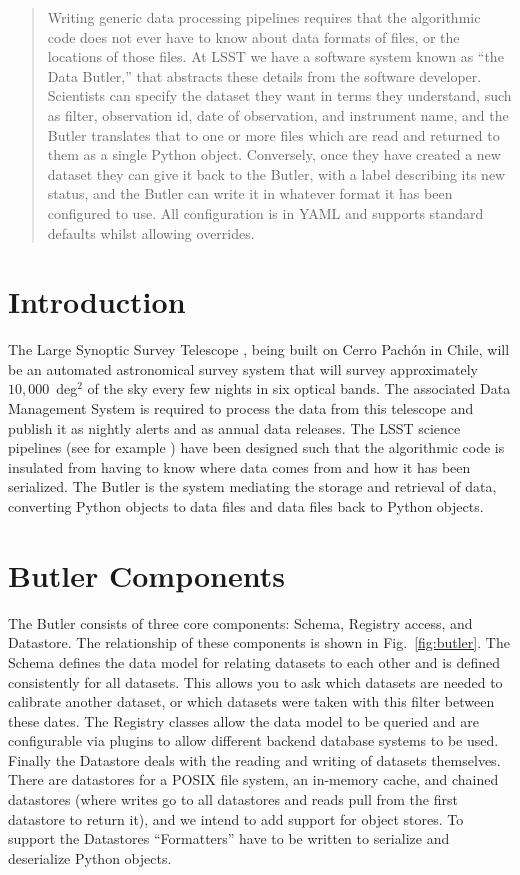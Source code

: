 \documentclass[11pt,twoside]{article}
\begin{document}
\begin{abstract}
  Writing generic data processing pipelines requires that the algorithmic code does not ever have to know about data formats of files, or the locations of those files.
  At LSST we have a software system known as ``the Data Butler,'' that abstracts these details from the software developer.
  Scientists can specify the dataset they want in terms they understand, such as filter, observation id, date of observation, and instrument name, and the Butler translates that to one or more files which are read and returned to them as a single Python object.
  Conversely, once they have created a new dataset they can give it back to the Butler, with a label describing its new status, and the Butler can write it in whatever format it has been configured to use.
  All configuration is in YAML and supports standard defaults whilst allowing overrides.
\end{abstract}

\section{Introduction}

The Large Synoptic Survey Telescope \citep{2008arXiv0805.2366I}, being built on Cerro Pach\'{o}n in Chile, will be an automated astronomical survey system that will survey approximately $10,000$~deg$^2$ of the sky every few nights in six optical bands.
The associated Data Management System \citep{2017ASPC..512..279J} is required to process the data from this telescope and publish it as nightly alerts and as annual data releases.
The LSST science pipelines (see for example \citet{2018PASJ...70S...5B}) have been designed such that the algorithmic code is insulated from having to know where data comes from and how it has been serialized.
The Butler is the system mediating the storage and retrieval of data, converting Python objects to data files and data files back to Python objects.

\section{Butler Components}

The Butler consists of  three core components: Schema, Registry access, and Datastore.
The relationship of these components is shown in Fig.~\ref{fig:butler}.
The Schema defines the data model for relating datasets to each other and is defined consistently for all datasets.
This allows you to ask which datasets are needed to calibrate another dataset, or which datasets were taken with this filter between these dates.
The Registry classes allow the data model to be queried and are configurable via plugins to allow different backend database systems to be used.
Finally the Datastore deals with the reading and writing of datasets themselves.
There are datastores for a POSIX file system, an in-memory cache, and chained datastores (where writes go to all datastores and reads pull from the first datastore to return it), and we intend to add support for object stores.
To support the Datastores ``Formatters'' have to be written to serialize and deserialize Python objects.
\end{document}
